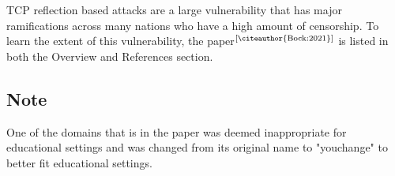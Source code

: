 \documentclass[letterpaper,12pt]{report}
\begin{document}
TCP reflection based attacks are a large vulnerability that has major ramifications across many nations who have a high amount of censorship. To learn the extent of this vulnerability, the paper$^\text{[\citeauthor{Bock:2021}]}$ is listed in both the Overview and References section.

\subsection*{Note}\label{sec:Note}

One of the domains that is in the paper was deemed inappropriate for educational settings and was changed from its original name to "youchange" to better fit educational settings.



\end{document}
